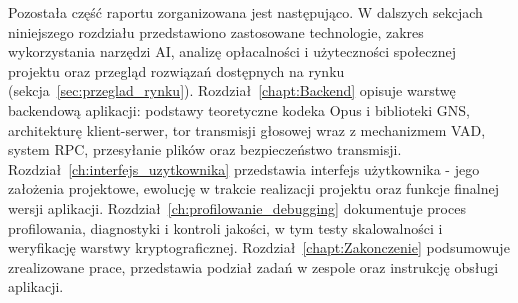 Pozostała część raportu zorganizowana jest następująco. W dalszych sekcjach
niniejszego rozdziału przedstawiono zastosowane technologie, zakres wykorzystania
narzędzi AI, analizę opłacalności i użyteczności społecznej projektu oraz przegląd
rozwiązań dostępnych na rynku (sekcja~\ref{sec:przeglad_rynku}).
Rozdział~\ref{chapt:Backend} opisuje warstwę backendową aplikacji: podstawy
teoretyczne kodeka Opus i biblioteki GNS, architekturę klient-serwer, tor transmisji
głosowej wraz z mechanizmem VAD, system RPC, przesyłanie plików oraz bezpieczeństwo
transmisji. Rozdział~\ref{ch:interfejs_uzytkownika} przedstawia interfejs
użytkownika - jego założenia projektowe, ewolucję w trakcie realizacji projektu
oraz funkcje finalnej wersji aplikacji. Rozdział~\ref{ch:profilowanie_debugging}
dokumentuje proces profilowania, diagnostyki i kontroli jakości, w tym testy
skalowalności i weryfikację warstwy kryptograficznej.
Rozdział~\ref{chapt:Zakonczenie} podsumowuje zrealizowane prace, przedstawia
podział zadań w zespole oraz instrukcję obsługi aplikacji.

